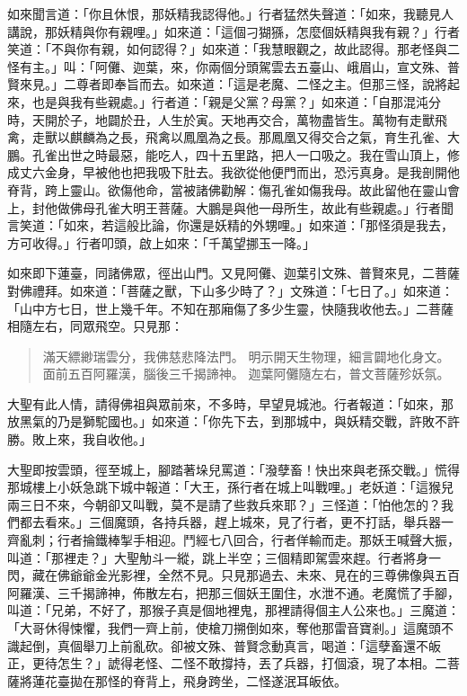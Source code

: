 如來聞言道：「你且休恨，那妖精我認得他。」行者猛然失聲道：「如來，我聽見人講說，那妖精與你有親哩。」如來道：「這個刁猢猻，怎麼個妖精與我有親？」行者笑道：「不與你有親，如何認得？」如來道：「我慧眼觀之，故此認得。那老怪與二怪有主。」叫：「阿儺、迦葉，來，你兩個分頭駕雲去五臺山、峨眉山，宣文殊、普賢來見。」二尊者即奉旨而去。如來道：「這是老魔、二怪之主。但那三怪，說將起來，也是與我有些親處。」行者道：「親是父黨？母黨？」如來道：「自那混沌分時，天開於子，地闢於丑，人生於寅。天地再交合，萬物盡皆生。萬物有走獸飛禽，走獸以麒麟為之長，飛禽以鳳凰為之長。那鳳凰又得交合之氣，育生孔雀、大鵬。孔雀出世之時最惡，能吃人，四十五里路，把人一口吸之。我在雪山頂上，修成丈六金身，早被他也把我吸下肚去。我欲從他便門而出，恐污真身。是我剖開他脊背，跨上靈山。欲傷他命，當被諸佛勸解：傷孔雀如傷我母。故此留他在靈山會上，封他做佛母孔雀大明王菩薩。大鵬是與他一母所生，故此有些親處。」行者聞言笑道：「如來，若這般比論，你還是妖精的外甥哩。」如來道：「那怪須是我去，方可收得。」行者叩頭，啟上如來：「千萬望挪玉一降。」

如來即下蓮臺，同諸佛眾，徑出山門。又見阿儺、迦葉引文殊、普賢來見，二菩薩對佛禮拜。如來道：「菩薩之獸，下山多少時了？」文殊道：「七日了。」如來道：「山中方七日，世上幾千年。不知在那廂傷了多少生靈，快隨我收他去。」二菩薩相隨左右，同眾飛空。只見那：
\begin{quote}
滿天縹緲瑞雲分，我佛慈悲降法門。
明示開天生物理，細言闢地化身文。
面前五百阿羅漢，腦後三千揭諦神。
迦葉阿儺隨左右，普文菩薩殄妖氛。
\end{quote}

大聖有此人情，請得佛祖與眾前來，不多時，早望見城池。行者報道：「如來，那放黑氣的乃是獅駝國也。」如來道：「你先下去，到那城中，與妖精交戰，許敗不許勝。敗上來，我自收他。」

大聖即按雲頭，徑至城上，腳踏著垛兒罵道：「潑孽畜！快出來與老孫交戰。」慌得那城樓上小妖急跳下城中報道：「大王，孫行者在城上叫戰哩。」老妖道：「這猴兒兩三日不來，今朝卻又叫戰，莫不是請了些救兵來耶？」三怪道：「怕他怎的？我們都去看來。」三個魔頭，各持兵器，趕上城來，見了行者，更不打話，舉兵器一齊亂刺；行者掄鐵棒掣手相迎。鬥經七八回合，行者佯輸而走。那妖王喊聲大振，叫道：「那裡走？」大聖觔斗一縱，跳上半空；三個精即駕雲來趕。行者將身一閃，藏在佛爺爺金光影裡，全然不見。只見那過去、未來、見在的三尊佛像與五百阿羅漢、三千揭諦神，佈散左右，把那三個妖王圍住，水泄不通。老魔慌了手腳，叫道：「兄弟，不好了，那猴子真是個地裡鬼，那裡請得個主人公來也。」三魔道：「大哥休得悚懼，我們一齊上前，使槍刀搠倒如來，奪他那雷音寶剎。」這魔頭不識起倒，真個舉刀上前亂砍。卻被文殊、普賢念動真言，喝道：「這孽畜還不皈正，更待怎生？」諕得老怪、二怪不敢撐持，丟了兵器，打個滾，現了本相。二菩薩將蓮花臺拋在那怪的脊背上，飛身跨坐，二怪遂泯耳皈依。

